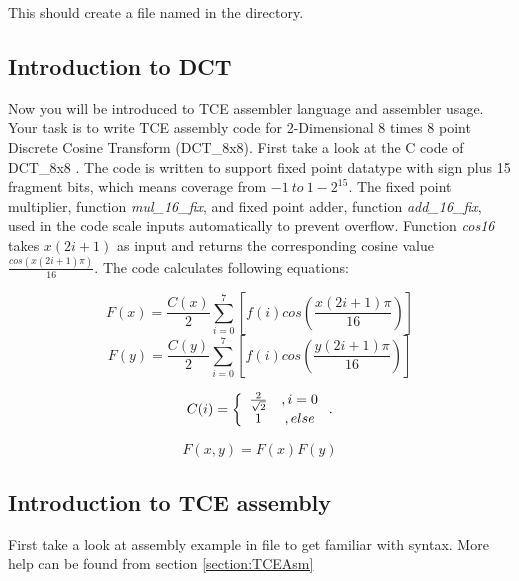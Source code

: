 \documentclass[twoside]{tceusermanual}
\begin{document}

This should create a file named  in the directory.

\subsection{Introduction to DCT}

Now you will be introduced to TCE assembler language and assembler usage.
Your task is to write TCE assembly code for 2-Dimensional 8 times 8 point 
Discrete Cosine Transform (DCT\_8x8).
First take a look at the C code of DCT\_8x8
.  
The code is written to support fixed point datatype with sign plus 15 fragment
bits, which means coverage from $-1\ to\ 1-2^{15}$. The fixed point
multiplier, function \textit{mul\_16\_fix}, and fixed point adder, function
\textit{add\_16\_fix},  used in the code scale inputs automatically to prevent
overflow. Function \textit{cos16} takes $x(2i+1)$ as input and returns
the corresponding cosine value $\frac{cos(x(2i+1)\pi)}{16}$. The code calculates
following equations:

\begin{equation}
F(x) = \frac{C(x)}{2}\sum_{i = 0}^7 \left[f(i)cos\left(\frac{x
\left(2i+1\right)\pi}{16}\right)\right] \nonumber
\end{equation}
\begin{equation}
F(y) = \frac{C(y)}{2}\sum_{i = 0}^7 \left[f(i)cos\left(\frac{y
\left(2i+1\right)\pi}{16}\right)\right] \nonumber
\end{equation}

\begin{equation}
C(i) = 
\left\{
\begin{array}{c c}
\frac{2}{\sqrt2} &,  i = 0 \\
1 &,  else 
\end{array} \right . . \nonumber
\end{equation}

\begin{equation}
F(x,y) = F(x)F(y) \nonumber
\end{equation}

\subsection{Introduction to TCE assembly}

First take a look at assembly example in file 
to get familiar with syntax. More help can be found from
section \ref{section:TCEAsm}
\end{document}
